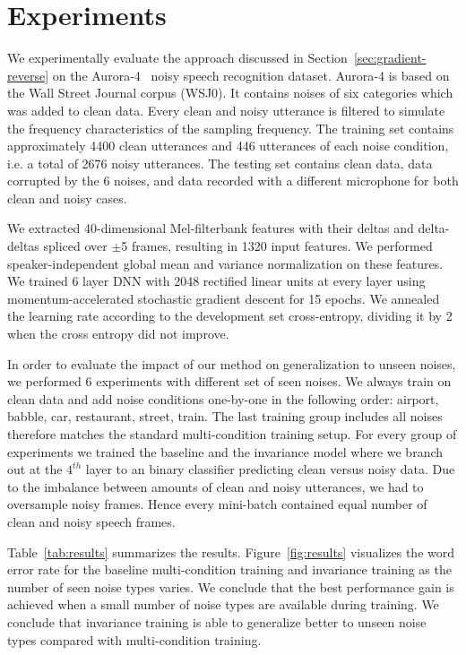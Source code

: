 \documentclass{article}
\begin{document}

\section{Experiments}
\label{sec:experiments}
We experimentally evaluate the approach discussed in Section~\ref{sec:gradient-reverse} 
on the Aurora-4~\cite{parihar2002aurora} noisy speech recognition dataset. Aurora-4
is based on the Wall Street Journal corpus (WSJ0). It contains noises of 
six categories which was added to clean
data. Every clean and noisy utterance is filtered to simulate the frequency characteristics of the sampling frequency. 
%
The training
set contains approximately 4400 clean utterances and 446 utterances of each noise condition,
i.e. a total of 2676 noisy utterances.
The testing
set contains clean data, data corrupted by the 6 noises, and data recorded with a different microphone
for both clean and noisy cases.

We extracted 40-dimensional Mel-filterbank features with their deltas and 
delta-deltas spliced over $\pm$5 frames, resulting in 1320 input 
features. We performed speaker-independent global mean and variance normalization on these features. We trained 6 layer
DNN with 2048 rectified linear units at every layer using momentum-accelerated stochastic gradient descent for 15 epochs. We annealed the learning rate according 
to the development set cross-entropy, dividing it by 2 when the cross entropy did not improve.

In order to evaluate the impact of our method on generalization to unseen noises,
we performed 6 experiments with different set of seen noises. We always train
on clean data and add noise conditions one-by-one in the following order: airport, babble, car, 
restaurant, street, train. The last training group includes all noises therefore matches the
standard multi-condition training setup. For every group of experiments we trained the
baseline and the invariance model where we branch out at the $4^{th}$ layer to an  
binary classifier predicting clean versus noisy data. Due to the imbalance between amounts of clean and
noisy utterances, we had to oversample noisy frames. Hence every mini-batch contained
equal number of clean and noisy speech frames.

Table~\ref{tab:results} summarizes the results. Figure~\ref{fig:results} visualizes the word error rate for the baseline multi-condition training and invariance training as the number of seen noise types varies. We conclude that the best performance
gain is achieved when a small number of noise types are available during training. We conclude that invariance training is able to generalize better to unseen noise types compared with multi-condition training.
\end{document}
